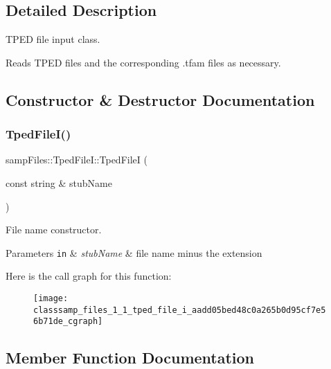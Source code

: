 \subsection{Detailed Description}
T\+P\+ED file input class. 

Reads T\+P\+ED files and the corresponding .tfam files as necessary. 

\subsection{Constructor \& Destructor Documentation}
\mbox{\label{classsamp_files_1_1_tped_file_i_aadd05bed48c0a265b0d95cf7e56b71de}} 
\subsubsection{\texorpdfstring{Tped\+File\+I()}{TpedFileI()}}
{\footnotesize\ttfamily samp\+Files\+::\+Tped\+File\+I\+::\+Tped\+FileI (\begin{DoxyParamCaption}\item[{const string \&}]{stub\+Name }\end{DoxyParamCaption})\hspace{0.3cm}{\ttfamily [inline]}}



File name constructor. 


\begin{DoxyParams}[1]{Parameters}
\mbox{\tt in}  & {\em stub\+Name} & file name minus the extension \\
\hline
\end{DoxyParams}
Here is the call graph for this function\+:\nopagebreak
\begin{figure}[H]
\begin{center}
\leavevmode
\texttt{[image: classsamp\_files\_1\_1\_tped\_file\_i\_aadd05bed48c0a265b0d95cf7e56b71de\_cgraph]}
\end{center}
\end{figure}


\subsection{Member Function Documentation}
\mbox{\label{classsamp_files_1_1_tped_file_i_af8b3f03ea942cd5bed77a45c9ebf46e3}} 

